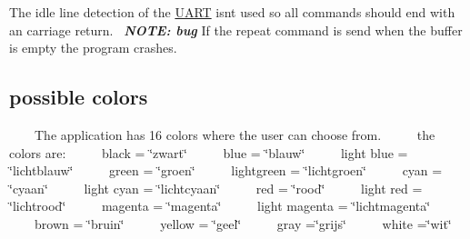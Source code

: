 The idle line detection of the \mbox{\hyperlink{namespace_u_a_r_t}{U\+A\+RT}} isn\textquotesingle{}t used so all commands should end with an carriage return.~\newline
 {\bfseries {\itshape N\+O\+TE\+: bug}} If the repeat command is send when the buffer is empty the program crashes.~\newline
\hypertarget{index_colors}{}\subsection{possible colors}\label{index_colors}
~~~~The application has 16 colors where the user can choose from.~\newline
 ~~~~the colors are\+:~\newline
 ~~~~black = \char`\"{}zwart\char`\"{}~\newline
 ~~~~blue = \char`\"{}blauw\char`\"{}~\newline
 ~~~~light blue = \char`\"{}lichtblauw\char`\"{}~\newline
 ~~~~green = \char`\"{}groen\char`\"{}~\newline
 ~~~~lightgreen = \char`\"{}lichtgroen\char`\"{}~\newline
 ~~~~cyan = \char`\"{}cyaan\char`\"{}~\newline
 ~~~~light cyan = \char`\"{}lichtcyaan\char`\"{}~\newline
 ~~~~red = \char`\"{}rood\char`\"{}~\newline
 ~~~~light red = \char`\"{}lichtrood\char`\"{}~\newline
 ~~~~magenta = \char`\"{}magenta\char`\"{}~\newline
 ~~~~light magenta = \char`\"{}lichtmagenta\char`\"{}~\newline
 ~~~~brown = \char`\"{}bruin\char`\"{}~\newline
 ~~~~yellow = \char`\"{}geel\char`\"{}~\newline
 ~~~~gray =\char`\"{}grijs\char`\"{}~\newline
 ~~~~white =\char`\"{}wit\char`\"{}~\newline
 